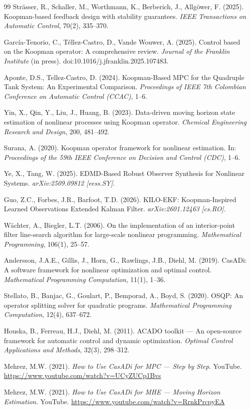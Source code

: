 \documentclass[12pt,letterpaper]{article}
\begin{document}
\begin{thebibliography}{99}
Strässer, R., Schaller, M., Worthmann, K., Berberich, J., Allgöwer, F. 
(2025). Koopman-based feedback design with stability guarantees. 
\textit{IEEE Transactions on Automatic Control}, 70(2), 335--370.

García-Tenorio, C., Téllez-Castro, D., Vande Wouwer, A. (2025). 
Control based on the Koopman operator: A comprehensive review. 
\textit{Journal of the Franklin Institute} (in press). 
doi:10.1016/j.jfranklin.2025.107483.

Aponte, D.S., Tellez-Castro, D. (2024). Koopman-Based MPC for the 
Quadruple Tank System: An Experimental Comparison. \textit{Proceedings 
of IEEE 7th Colombian Conference on Automatic Control (CCAC)}, 1--6.

Yin, X., Qin, Y., Liu, J., Huang, B. (2023). Data-driven moving 
horizon state estimation of nonlinear processes using Koopman operator. 
\textit{Chemical Engineering Research and Design}, 200, 481--492.

Surana, A. (2020). Koopman operator framework for nonlinear estimation. 
In: \textit{Proceedings of the 59th IEEE Conference on Decision and 
Control (CDC)}, 1--6.

Ye, X., Tang, W. (2025). EDMD-Based Robust Observer Synthesis for 
Nonlinear Systems. \textit{arXiv:2509.09812 [eess.SY]}.

Guo, Z.C., Forbes, J.R., Barfoot, T.D. (2026). KILO-EKF: 
Koopman-Inspired Learned Observations Extended Kalman Filter. 
\textit{arXiv:2601.12463 [cs.RO]}.

Wächter, A., Biegler, L.T. (2006). On the implementation of an 
interior-point filter line-search algorithm for large-scale nonlinear 
programming. \textit{Mathematical Programming}, 106(1), 25--57.

Andersson, J.A.E., Gillis, J., Horn, G., Rawlings, J.B., Diehl, M. 
(2019). CasADi: A software framework for nonlinear optimization and 
optimal control. \textit{Mathematical Programming Computation}, 
11(1), 1--36.

Stellato, B., Banjac, G., Goulart, P., Bemporad, A., Boyd, S. (2020). 
OSQP: An operator splitting solver for quadratic programs. 
\textit{Mathematical Programming Computation}, 12(4), 637--672.

Houska, B., Ferreau, H.J., Diehl, M. (2011). ACADO toolkit --- An 
open-source framework for automatic control and dynamic optimization. 
\textit{Optimal Control Applications and Methods}, 32(3), 298--312.

Mehrez, M.W. (2021). \textit{How to Use CasADi for MPC --- Step by 
Step}. YouTube. 
\url{https://www.youtube.com/watch?v=UCyZUCp1Bvs}

Mehrez, M.W. (2021). \textit{How to Use CasADi for MHE --- Moving 
Horizon Estimation}. YouTube. 
\url{https://www.youtube.com/watch?v=RrnkPrcpyEA}
\end{thebibliography}
\end{document}
